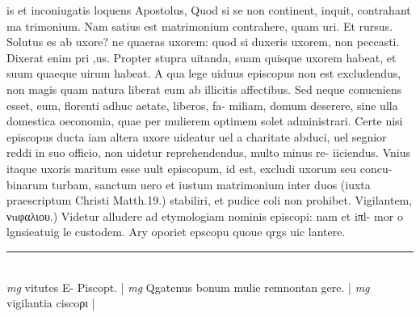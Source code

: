 \documentclass{article}
\begin{document}
\begin{pages}
is et inconiugatis loquens Apostolus, Quod si se non continent, inquit, contrahant ma trimonium. Nam satius est matrimonium contrahere, quam uri. Et rursus. Solutus es ab uxore? ne quaeras uxorem: quod si duxeris uxorem, non peccasti. Dixerat enim pri ,us. Propter stupra uitanda, suam quisque uxorem habeat, et suum quaeque uirum habeat. A qua lege uiduus episcopus non est excludendus, non magis quam natura liberat eum ab illicitis affectibus. Sed neque conueniens esset, eum, florenti adhuc aetate, liberos, fa- miliam, domum deserere, sine ulla domestica oeconomia, quae per mulierem optimem solet administrari. Certe nisi episcopus ducta iam altera uxore uideatur uel a charitate abduci, uel segnior reddi in suo officio, non uidetur reprehendendus, multo minus re- iiciendus. Vnius itaque uxoris maritum esse uult episcopum, id est, excludi uxorum seu concu- binarum turbam, sanctum uero et iustum matrimonium inter duos (iuxta praescriptum Christi Matth.19.) stabiliri, et pudice coli non prohibet.  \pend\pstart  Vigilantem, νuφαλιου.) Videtur alludere ad etymologiam nominis episcopi: nam et iπl- mor o lgnsieatuig le custodem. Ary oporiet epscopu quoue qrgs uic lantere.  \pend
\vspace{0.5cm}\noindent
\vspace{0.2cm}\rule{1cm}{0.2pt}\\ 
\hspace{0.2cm}\textit{mg}
\footnotesize vitutes E- Piscopt. 
\normalsize| 
\hspace{0.2cm}\textit{mg}
\footnotesize Qgatenus bonum mulie remnontan gere. 
\normalsize| 
\hspace{0.2cm}\textit{mg}
\footnotesize vigilantia ciscoρι 
\normalsize| 

\end{pages}
\end{document}
